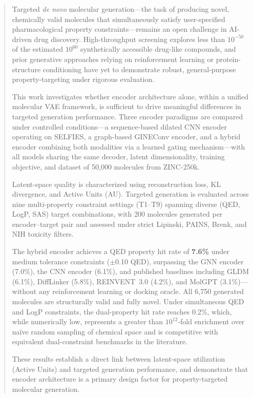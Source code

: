 \documentclass[conference]{IEEEtran}
\begin{document}
\begin{abstract}
Targeted \textit{de novo} molecular generation---the task of producing novel, chemically valid molecules that simultaneously satisfy user-specified pharmacological property constraints---remains an open challenge in AI-driven drug discovery. High-throughput screening explores less than $10^{-50}$ of the estimated $10^{60}$ synthetically accessible drug-like compounds, and prior generative approaches relying on reinforcement learning or protein-structure conditioning have yet to demonstrate robust, general-purpose property-targeting under rigorous evaluation.

This work investigates whether encoder architecture alone, within a unified molecular VAE framework, is sufficient to drive meaningful differences in targeted generation performance. Three encoder paradigms are compared under controlled conditions---a sequence-based dilated CNN encoder operating on SELFIES, a graph-based GINEConv encoder, and a hybrid encoder combining both modalities via a learned gating mechanism---with all models sharing the same decoder, latent dimensionality, training objective, and dataset of 50,000 molecules from ZINC-250k.

Latent-space quality is characterized using reconstruction loss, KL divergence, and Active Units (AU). Targeted generation is evaluated across nine multi-property constraint settings (T1--T9) spanning diverse (QED, LogP, SAS) target combinations, with 200 molecules generated per encoder--target pair and assessed under strict Lipinski, PAINS, Brenk, and NIH toxicity filters.

The hybrid encoder achieves a QED property hit rate of \textbf{7.6\%} under medium tolerance constraints ($\pm$0.10 QED), surpassing the GNN encoder (7.0\%), the CNN encoder (6.1\%), and published baselines including GLDM (6.1\%), DiffLinker (5.8\%), REINVENT~3.0 (4.2\%), and MolGPT (3.1\%)---without any reinforcement learning or docking oracle. All 6,750 generated molecules are structurally valid and fully novel. Under simultaneous QED and LogP constraints, the dual-property hit rate reaches 0.2\%, which, while numerically low, represents a greater than $10^{12}$-fold enrichment over na\"{i}ve random sampling of chemical space and is competitive with equivalent dual-constraint benchmarks in the literature.

These results establish a direct link between latent-space utilization (Active Units) and targeted generation performance, and demonstrate that encoder architecture is a primary design factor for property-targeted molecular generation.
\end{abstract}
\end{document}
